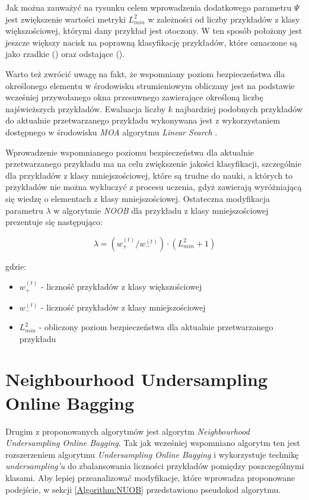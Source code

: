 \noindent Jak można zauważyć na rysunku celem wprowadzenia dodatkowego parametru $\Psi$ jest zwiększenie wartości metryki $L^2_{min}$ w zależności od liczby przykładów z klasy większościowej, którymi dany przykład jest otoczony. W ten sposób położony jest jeszcze większy nacisk na poprawną klasyfikację przykładów, które oznaczone są jako rzadkie () oraz odstające (). 

Warto też zwrócić uwagę na fakt, że wspomniany poziom bezpieczeństwa dla określonego elementu w środowisku strumieniowym obliczany jest na podstawie wcześniej przywołanego okna przesuwnego zawierające określoną liczbę najświeższych przykładów. Ewaluacja liczby $k$ najbardziej podobnych przykładów do aktualnie przetwarzanego przykładu wykonywana jest z wykorzystaniem dostępnego w środowisku \textit{MOA} algorytmu \textit{Linear Search} \cite{Article:LinearSearch}.

Wprowadzenie wspomnianego poziomu bezpieczeństwa dla aktualnie przetwarzanego przykładu ma na celu zwiększenie jakości klasyfikacji, szczególnie dla przykładów z klasy mniejszościowej, które są trudne do nauki, a których to przykładów nie można wykluczyć z procesu uczenia, gdyż zawierają wyróżniającą się wiedzę o elementach z klasy mniejszościowej. Ostateczna modyfikacja parametru $\lambda$ w algorytmie \textit{NOOB} dla przykładu z klasy mniejszościowej prezentuje się następująco:

\begin{equation}
    \lambda = (w^{(t)}_{+}/w^{(t)}_{-}) \cdot (L^2_{min} + 1)
\end{equation}

\noindent gdzie:

\begin{itemize}
    \item $w^{(t)}_{+}$ - liczność przykładów z klasy większościowej
    \item $w^{(t)}_{-}$ - liczność przykładów z klasy mniejszościowej
    \item $L^2_{min}$ - obliczony poziom bezpieczeństwa dla aktualnie przetwarzanego przykładu
\end{itemize}

\newpage

\section{Neighbourhood Undersampling Online Bagging}

\noindent Drugim z proponowanych algorytmów jest algorytm \textit{Neighbourhood Undersampling Online Bagging}. Tak jak wcześniej wspomniano algorytm ten jest rozszerzeniem algorytmu \textit{Undersampling Online Bagging} i wykorzystuje technikę \textit{undersampling'u} do zbalansowania liczności przykładów pomiędzy poszczególnymi klasami. Aby lepiej przeanalizować modyfikacje, które wprowadza proponowane podejście, w sekcji \ref{Algorithm:NUOB} przedstawiono pseudokod algorytmu.

